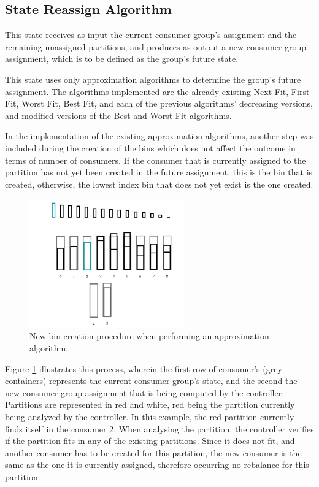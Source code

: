 \subsection{State Reassign Algorithm}

This state receives as input the current consumer group's assignment and the remaining unassigned partitions, and produces as output a new consumer group assignment, which is to be defined as the group's future state.

This state uses only approximation algorithms to determine the group's future assignment. The algorithms implemented are the already existing Next Fit, First Fit, Worst Fit, Best Fit, and each of the previous algorithms' decreasing versions, and modified versions of the Best and Worst Fit algorithms. 

In the implementation of the existing approximation algorithms, another step was included during the creation of the bins which does not affect the outcome in terms of number of consumers. If the consumer that is currently assigned to the partition has not yet been created in the future assignment, this is the bin that is created, otherwise, the lowest index bin that does not yet exist is the one created.
 
\begin{figure}[H]
    \centering
    \includegraphics[width=0.6\textwidth]{images/controller/ApproximationAlgorithm_NewBin.png}
\caption{New bin creation procedure when performing an approximation algorithm.}
\label{fig:approximation_bin_creation}
\end{figure}

Figure \ref{fig:approximation_bin_creation} illustrates this process, wherein the first row of consumer's (grey containers) represents the current consumer group's state, and the second the new consumer group assignment that is being computed by the controller. Partitions are represented in red and white, red being the partition currently being analyzed by the controller. In this example, the red partition currently finds itself in the consumer 2. When analysing the partition, the controller verifies if the partition fits in any of the existing partitions. Since it does not fit, and another consumer has to be created for this partition, the new consumer is the same as the one it is currently assigned, therefore occurring no rebalance for this partition.

